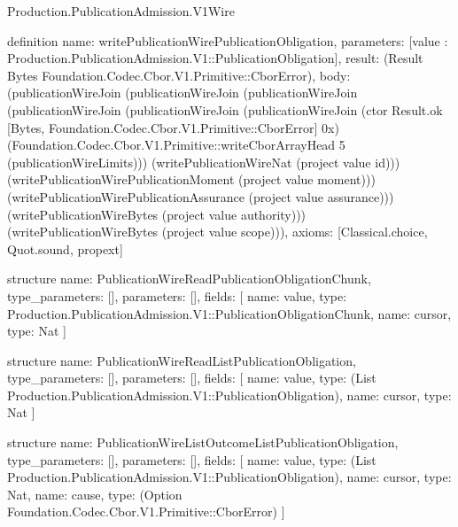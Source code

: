 \begin{lexlean}{Production.PublicationAdmission.V1Wire}
\begin{semanticmodule}
definition{
  name: writePublicationWirePublicationObligation,
  parameters: [value : Production.PublicationAdmission.V1::PublicationObligation],
  result: (Result Bytes Foundation.Codec.Cbor.V1.Primitive::CborError),
  body: (publicationWireJoin (publicationWireJoin (publicationWireJoin (publicationWireJoin (publicationWireJoin (publicationWireJoin (ctor Result.ok [Bytes, Foundation.Codec.Cbor.V1.Primitive::CborError] 0x) (Foundation.Codec.Cbor.V1.Primitive::writeCborArrayHead 5 (publicationWireLimits))) (writePublicationWireNat (project value id))) (writePublicationWirePublicationMoment (project value moment))) (writePublicationWirePublicationAssurance (project value assurance))) (writePublicationWireBytes (project value authority))) (writePublicationWireBytes (project value scope))),
  axioms: [Classical.choice, Quot.sound, propext]
}

structure{
  name: PublicationWireReadPublicationObligationChunk,
  type_parameters: [],
  parameters: [],
  fields: [
    {name: value, type: Production.PublicationAdmission.V1::PublicationObligationChunk},
    {name: cursor, type: Nat}
  ]
}

structure{
  name: PublicationWireReadListPublicationObligation,
  type_parameters: [],
  parameters: [],
  fields: [
    {name: value, type: (List Production.PublicationAdmission.V1::PublicationObligation)},
    {name: cursor, type: Nat}
  ]
}

structure{
  name: PublicationWireListOutcomeListPublicationObligation,
  type_parameters: [],
  parameters: [],
  fields: [
    {name: value, type: (List Production.PublicationAdmission.V1::PublicationObligation)},
    {name: cursor, type: Nat},
    {name: cause, type: (Option Foundation.Codec.Cbor.V1.Primitive::CborError)}
  ]
}


\end{semanticmodule}
\end{lexlean}
